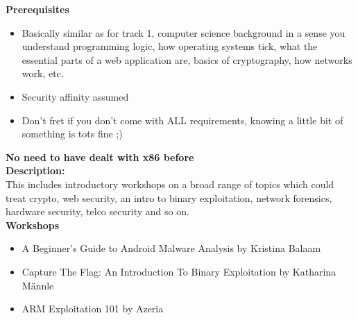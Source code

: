 \def\abstracttitle{Introduction to hack all the things (Beginners / Intermediate)}
\def\abstractcomment{Track 2: new world conquest}
\def\abstractowner{Various}

\thispagestyle{abstract}

  \textbf{Prerequisites}
  \begin{itemize}
  	\item Basically similar as for track 1, computer science background in a sense you understand programming logic, how operating systems tick, what the essential parts of a web application are, basics of cryptography, how networks work, etc.
    \item Security affinity assumed
    \item Don't fret if you don't come with ALL requirements, knowing a little bit of something is tots fine ;)
  \end{itemize}

  \textbf{No need to have dealt with x86 before}\\

  \textbf{Description:}\\

  This includes introductory workshops on a broad range of topics which could treat crypto, web security, an intro to binary exploitation, network forensics, hardware security, telco security and so on.\\

  \textbf{Workshops}
  \begin{itemize}
  	\item A Beginner’s Guide to Android Malware Analysis by Kristina Balaam
    \item Capture The Flag: An Introduction To Binary Exploitation by Katharina Männle
    \item ARM Exploitation 101 by Azeria
  \end{itemize}
